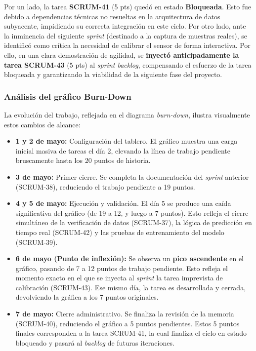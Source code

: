 Por un lado, la tarea \textbf{SCRUM-41} (5 pts) quedó en estado \textbf{Bloqueada}. Esto fue debido a dependencias técnicas no resueltas en la arquitectura de datos subyacente, impidiendo su correcta integración en este ciclo. Por otro lado, ante la inminencia del siguiente \textit{sprint} (destinado a la captura de muestras reales), se identificó como crítica la necesidad de calibrar el sensor de forma interactiva. Por ello, en una clara demostración de agilidad, se \textbf{inyectó anticipadamente la tarea SCRUM-43} (5 pts) al \textit{sprint backlog}, compensando el esfuerzo de la tarea bloqueada y garantizando la viabilidad de la siguiente fase del proyecto.

\subsubsection{Análisis del gráfico Burn-Down}

La evolución del trabajo, reflejada en el diagrama \textit{burn-down}, ilustra visualmente estos cambios de alcance:

\begin{itemize}
    \item \textbf{1 y 2 de mayo:} Configuración del tablero. El gráfico muestra una carga inicial masiva de tareas el día 2, elevando la línea de trabajo pendiente bruscamente hasta los 20 puntos de historia.
    \item \textbf{3 de mayo:} Primer cierre. Se completa la documentación del \textit{sprint} anterior (SCRUM-38), reduciendo el trabajo pendiente a 19 puntos.
    \item \textbf{4 y 5 de mayo:} Ejecución y validación. El día 5 se produce una caída significativa del gráfico (de 19 a 12, y luego a 7 puntos). Esto refleja el cierre simultáneo de la verificación de datos (SCRUM-37), la lógica de predicción en tiempo real (SCRUM-42) y las pruebas de entrenamiento del modelo (SCRUM-39).
    \item \textbf{6 de mayo (Punto de inflexión):} Se observa un \textbf{pico ascendente} en el gráfico, pasando de 7 a 12 puntos de trabajo pendiente. Esto refleja el momento exacto en el que se inyecta al \textit{sprint} la tarea imprevista de calibración (SCRUM-43). Ese mismo día, la tarea es desarrollada y cerrada, devolviendo la gráfica a los 7 puntos originales.
    \item \textbf{7 de mayo:} Cierre administrativo. Se finaliza la revisión de la memoria (SCRUM-40), reduciendo el gráfico a 5 puntos pendientes. Estos 5 puntos finales corresponden a la tarea SCRUM-41, la cual finaliza el ciclo en estado bloqueado y pasará al \textit{backlog} de futuras iteraciones.
\end{itemize}

